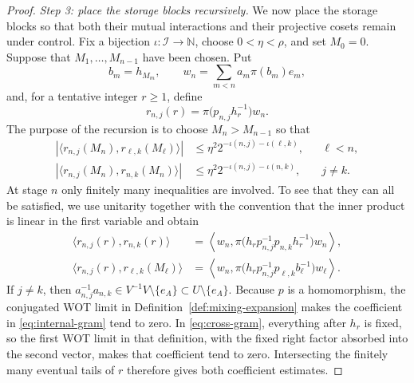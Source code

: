 \documentclass[reqno]{amsart}
\numberwithin{equation}{section}
\theoremstyle{definition}
\theoremstyle{remark}
\newcommand{\cI}{\mathcal I}
\newcommand{\N}{\mathbb N}
\newcommand{\Step}[1]{\par\medskip\noindent\textit{#1.}\quad}
\begin{document}
\begin{proof}
\Step{Step 3: place the storage blocks recursively}
We now place the storage blocks so that both their mutual interactions and
their projective cosets remain under control.  Fix a bijection
$\iota:\cI\to\N$, choose $0<\eta<\rho$, and set $M_0=0$.
Suppose that $M_1,\ldots,M_{n-1}$ have been chosen.  Put
\begin{equation}\label{eq:past-storage-vector}
 b_m=h_{M_m},
 \qquad
 w_n=\sum_{m<n}a_m\pi(b_m)e_m,
\end{equation}
and, for a tentative integer $r\geq1$, define
\begin{equation}\label{eq:past-column-tentative}
 r_{n,j}(r)=\pi\bigl(p_{n,j}h_r^{-1}\bigr)w_n.
\end{equation}
The purpose of the recursion is to choose $M_n>M_{n-1}$ so that
\begin{align}
 |\langle r_{n,j}(M_n),r_{\ell,k}(M_\ell)\rangle|
 &\leq \eta^2 2^{-\iota(n,j)-\iota(\ell,k)},
 &&\ell<n,                                      \label{eq:cross-budget}\\
 |\langle r_{n,j}(M_n),r_{n,k}(M_n)\rangle|
 &\leq \eta^2 2^{-\iota(n,j)-\iota(n,k)},
 &&j\neq k.                                     \label{eq:internal-budget}
\end{align}
At stage $n$ only finitely many inequalities are involved.  To see that they
can all be satisfied, we use unitarity together with the convention that the
inner product is linear in the first variable and obtain
\begin{align}
 \langle r_{n,j}(r),r_{n,k}(r)\rangle
 &=\left\langle w_n,
 \pi\bigl(h_rp_{n,j}^{-1}p_{n,k}h_r^{-1}\bigr)w_n
 \right\rangle,                                  \label{eq:internal-gram}\\
 \langle r_{n,j}(r),r_{\ell,k}(M_\ell)\rangle
 &=\left\langle w_n,
 \pi\bigl(h_rp_{n,j}^{-1}p_{\ell,k}b_\ell^{-1}\bigr)w_\ell
 \right\rangle.                                  \label{eq:cross-gram}
\end{align}
If $j\neq k$, then
$a_{n,j}^{-1}a_{n,k}\in V^{-1}V\setminus\{e_A\}\subset U\setminus\{e_A\}$.
Because $p$ is a homomorphism, the conjugated WOT limit in
Definition~\ref{def:mixing-expansion} makes the coefficient in
\eqref{eq:internal-gram} tend to zero.  In \eqref{eq:cross-gram}, everything
after $h_r$ is fixed, so the first WOT limit in that definition, with the
fixed right factor absorbed into the second vector, makes that coefficient
tend to zero.  Intersecting the finitely many eventual tails of $r$ therefore
gives both coefficient estimates.


\end{proof}
\end{document}
